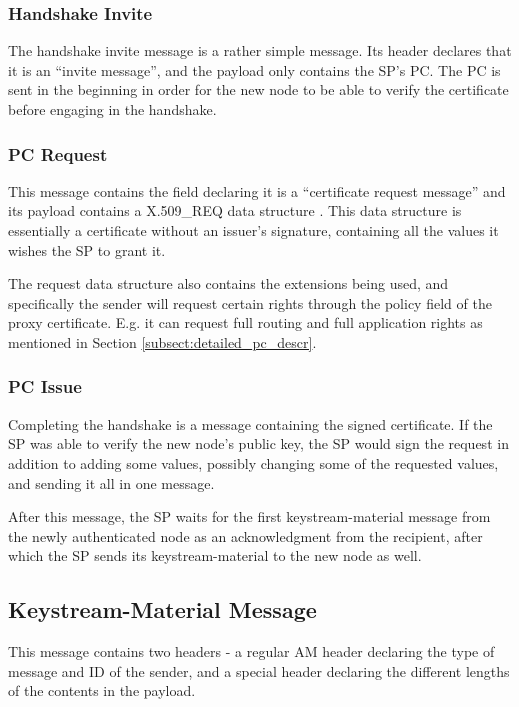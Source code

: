 \subsubsection*{Handshake Invite}
The handshake invite message is a rather simple message. Its header declares
that it is an ``invite message'', and the payload only contains the SP's 
\ac{PC}. The \ac{PC} is sent in the beginning in order for the new node to be
able to verify the certificate before engaging in the handshake.

\subsubsection*{\acl{PC} Request}
This message contains the field declaring it is a ``certificate request
message'' and its payload contains a X.509\_REQ data structure
\cite{viega2002network}. This data structure is essentially a certificate
without an issuer's signature, containing all the values it wishes the \ac{SP}
to grant it.

The request data structure also contains the extensions being used, and
specifically the sender will request certain rights through the policy field of
the proxy certificate. E.g. it can request full routing and full application
rights as mentioned in Section \ref{subsect:detailed_pc_descr}.

\subsubsection*{\acl{PC} Issue}
Completing the handshake is a message containing the signed certificate. If the
\ac{SP} was able to verify the new node's public key, the \ac{SP} would sign the
request in addition to adding some values, possibly changing some of the
requested values, and sending it all in one message.

After this message, the \ac{SP} waits for the first keystream-material message
from the newly authenticated node as an acknowledgment from the recipient,
after which the \ac{SP} sends its keystream-material to the new node as well.

\subsection{Keystream-Material Message}
This message contains two headers - a regular AM header declaring the type of
message and ID of the sender, and a special header declaring the different
lengths of the contents in the payload.

